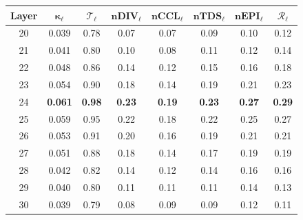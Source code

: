 \begin{table}[ht!]
{}
\vspace{0.5em}
\begin{tabular}{|c|c|c|c|c|c|c|c|}
\hline
\textbf{Layer} & \(\boldsymbol{\kappa_\ell}\) & \(\boldsymbol{\mathcal{T}_\ell}\) & \(\textbf{nDIV}_\ell\) & \(\textbf{nCCL}_\ell\) & \(\textbf{nTDS}_\ell\) & \(\textbf{nEPI}_\ell\) & \(\boldsymbol{\mathcal{R}_\ell}\) \\
\hline
20 & \cellcolor{green!15}0.039 & \cellcolor{green!15}0.78 & \cellcolor{green!15}0.07 & \cellcolor{yellow!25}0.07 & \cellcolor{green!15}0.09 & \cellcolor{green!20}0.10 & \cellcolor{green!15}0.12 \\
21 & \cellcolor{green!20}0.041 & \cellcolor{green!20}0.80 & \cellcolor{green!20}0.10 & \cellcolor{yellow!30}0.08 & \cellcolor{green!20}0.11 & \cellcolor{green!25}0.12 & \cellcolor{green!20}0.14 \\
22 & \cellcolor{yellow!25}0.048 & \cellcolor{yellow!25}0.86 & \cellcolor{yellow!25}0.14 & \cellcolor{orange!25}0.12 & \cellcolor{yellow!25}0.15 & \cellcolor{yellow!25}0.16 & \cellcolor{yellow!25}0.18 \\
23 & \cellcolor{orange!30}0.054 & \cellcolor{orange!30}0.90 & \cellcolor{orange!30}0.18 & \cellcolor{orange!30}0.14 & \cellcolor{orange!30}0.19 & \cellcolor{orange!30}0.21 & \cellcolor{orange!30}0.23 \\
\rowcolor{red!15} 24 & \cellcolor{red!35}\textbf{0.061} & \cellcolor{red!35}\textbf{0.98} & \cellcolor{red!40}\textbf{0.23} & \cellcolor{red!40}\textbf{0.19} & \cellcolor{red!35}\textbf{0.23} & \cellcolor{red!35}\textbf{0.27} & \cellcolor{red!40}\textbf{0.29} \\
\rowcolor{red!10} 25 & \cellcolor{red!30}0.059 & \cellcolor{red!30}0.95 & \cellcolor{red!35}0.22 & \cellcolor{red!35}0.18 & \cellcolor{red!30}0.22 & \cellcolor{red!30}0.25 & \cellcolor{red!35}0.27 \\
26 & \cellcolor{yellow!30}0.053 & \cellcolor{yellow!30}0.91 & \cellcolor{orange!30}0.20 & \cellcolor{orange!25}0.16 & \cellcolor{yellow!30}0.19 & \cellcolor{yellow!30}0.21 & \cellcolor{orange!30}0.21 \\
27 & \cellcolor{yellow!25}0.051 & \cellcolor{yellow!25}0.88 & \cellcolor{orange!25}0.18 & \cellcolor{yellow!20}0.14 & \cellcolor{yellow!25}0.17 & \cellcolor{yellow!25}0.19 & \cellcolor{yellow!25}0.19 \\
28 & \cellcolor{green!20}0.042 & \cellcolor{green!20}0.82 & \cellcolor{yellow!25}0.14 & \cellcolor{yellow!15}0.12 & \cellcolor{green!20}0.14 & \cellcolor{green!20}0.16 & \cellcolor{green!20}0.16 \\
29 & \cellcolor{green!15}0.040 & \cellcolor{green!15}0.80 & \cellcolor{green!20}0.11 & \cellcolor{yellow!10}0.11 & \cellcolor{green!15}0.11 & \cellcolor{green!15}0.14 & \cellcolor{green!15}0.13 \\
30 & \cellcolor{green!15}0.039 & \cellcolor{green!15}0.79 & \cellcolor{green!15}0.08 & \cellcolor{green!10}0.09 & \cellcolor{green!15}0.09 & \cellcolor{green!15}0.12 & \cellcolor{green!15}0.11 \\
\hline
\end{tabular}
\label{tab:pair_attack_metrics}
\end{table}
